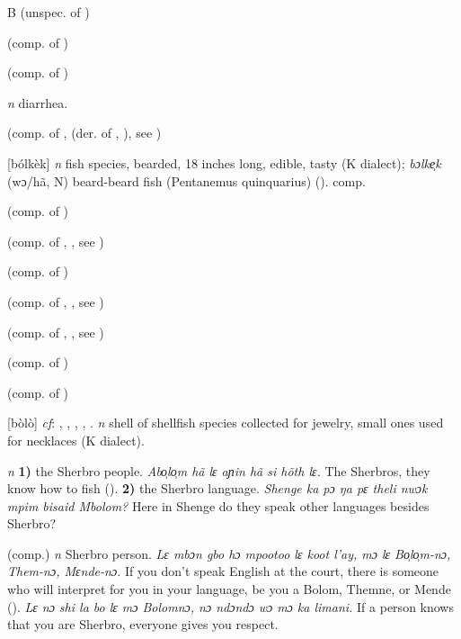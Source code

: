 \begin{letter}{B}
 (unspec. of ) 

 (comp. of ) 

 (comp. of ) 

 \textit{n} diarrhea.

 (comp. of ,  (der. of , ), see ) 

 [bólkèk] \textit{n} fish species, bearded, 18 inches long, edible, tasty (K dialect); \textit{bɔlke̹k} (wɔ/hã, N) beard-beard fish (Pentanemus quinquarius) (\citealt{Pichl1967}). comp. 

 (comp. of ) 

 (comp. of , , see ) 

 (comp. of ) 

 (comp. of , , see ) 

 (comp. of , , see ) 

 (comp. of ) 

 (comp. of ) 

 [bòlò] \textit{cf}: , , , , . \textit{n} shell of shellfish species collected for jewelry, small ones used for necklaces (K dialect). 

 \textit{n} \textbf{1)} the Sherbro people. \textit{Abo̹lo̹m hã lɛ aɲin hã si hõth lɛ.} The Sherbros, they know how to fish (\citealt{Pichl1967}). \textbf{2)} the Sherbro language. \textit{Shenge ka pɔ ŋa pɛ theli nwɔk mpim bisaid Mbolom?} Here in Shenge do they speak other languages besides Sherbro?

 (comp.) \textit{n} Sherbro person. \textit{Lɛ mbɔn gbo hɔ mpootoo lɛ koot l'ay, mɔ lɛ Bo̹lo̹m-nɔ, Them-nɔ, Mɛnde-nɔ.} If you don't speak English at the court, there is someone who will interpret for you in your language, be you a Bolom, Themne, or Mende (\citealt{Pichl1967}). \textit{Lɛ nɔ shi la bo lɛ mɔ Bolomnɔ, nɔ ndɔndɔ wɔ mɔ ka limani.} If a person knows that you are Sherbro, everyone gives you respect.


\end{letter}
